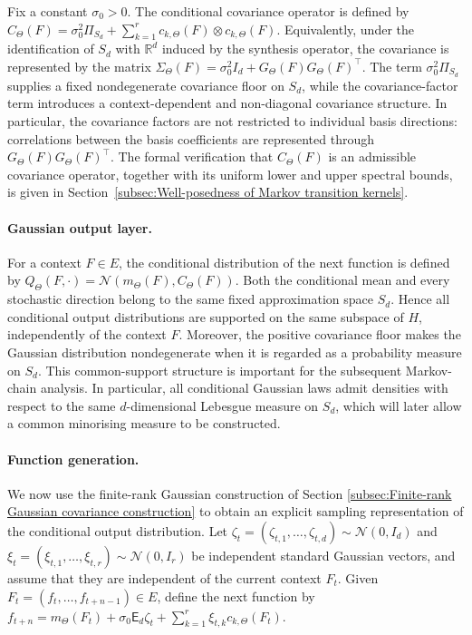 Fix a constant \(\sigma_0>0\). The conditional covariance operator is defined by \(C_\Theta(F)=\sigma_0^2\Pi_{S_d}+\sum_{k=1}^r c_{k,\Theta}(F)\otimes c_{k,\Theta}(F)\). Equivalently, under the identification of \(S_d\) with \(\mathbb R^d\) induced by the synthesis operator, the covariance is represented by the matrix \(\Sigma_\Theta(F)=\sigma_0^2I_d+G_\Theta(F)G_\Theta(F)^\top\).
The term \(\sigma_0^2\Pi_{S_d}\) supplies a fixed nondegenerate covariance floor on \(S_d\), while the covariance-factor term introduces a context-dependent and non-diagonal covariance structure. In particular, the covariance factors are not restricted to individual basis directions: correlations between the basis coefficients are represented through \(G_\Theta(F)G_\Theta(F)^\top\).
The formal verification that \(C_\Theta(F)\) is an admissible covariance operator, together with its uniform lower and upper spectral bounds, is given in Section~\ref{subsec:Well-posedness of Markov transition kernels}.

\paragraph{Gaussian output layer.}

For a context \(F\in E\), the conditional distribution of the next function is defined by \(Q_\Theta(F,\cdot)=\mathcal N(m_\Theta(F),C_\Theta(F))\).
Both the conditional mean and every stochastic direction belong to the same fixed approximation space \(S_d\). Hence all conditional output distributions are supported on the same subspace of \(H\), independently of the context \(F\). Moreover, the positive covariance floor makes the Gaussian distribution nondegenerate when it is regarded as a probability measure on \(S_d\).
This common-support structure is important for the subsequent Markov-chain analysis. In particular, all conditional Gaussian laws admit densities with respect to the same \(d\)-dimensional Lebesgue measure on \(S_d\), which will later allow a common minorising measure to be constructed.

\paragraph{Function generation.}

We now use the finite-rank Gaussian construction of Section \ref{subsec:Finite-rank Gaussian covariance construction} to obtain an explicit sampling representation of the conditional output distribution. Let \(\zeta_t=(\zeta_{t,1},\ldots,\zeta_{t,d})\sim\mathcal N(0,I_d)\) and \(\xi_t=(\xi_{t,1},\ldots,\xi_{t,r})\sim\mathcal N(0,I_r)\) be independent standard Gaussian vectors, and assume that they are independent of the current context \(F_t\). Given \(F_t=(f_t,\ldots,f_{t+n-1})\in E\), define the next function by \(f_{t+n}=m_\Theta(F_t)+\sigma_0\mathsf E_d\zeta_t+\sum_{k=1}^r\xi_{t,k}c_{k,\Theta}(F_t)\).

